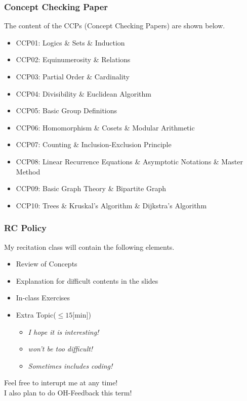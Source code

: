 \documentclass{beamer}
\begin{document}
\begin{frame}
    \frametitle{Concept Checking Paper}
    The content of the CCPs (Concept Checking Papers) are shown below.
    \begin{itemize}
        \item CCP01: \*\*\* Logics \& Sets \& Induction
        \item CCP02: \*\*\* Equinumerosity \& Relations
        \item CCP03: \*\*\* Partial Order \& Cardinality
        \item CCP04: \*\*\* Divisibility \&  Euclidean Algorithm
        \item CCP05: \*\*\* Basic Group Definitions
        \item CCP06: \*\*\* Homomorphism \& Cosets \& Modular Arithmetic
        \item CCP07: \*\*\* Counting \& Inclusion-Exclusion Principle
        \item CCP08: \*\*\* Linear Recurrence Equations \& Asymptotic Notations \& Master Method
        \item CCP09: \*\*\* Basic Graph Theory \& Bipartite Graph
        \item CCP10: \*\*\* Trees \& Kruskal's Algorithm \& Dijkstra's Algorithm
    \end{itemize}
\end{frame}
\begin{frame}
    \frametitle{RC Policy}
    \hh
    My recitation class will contain the following elements.
    \vv
    \begin{itemize}
        \item Review of Concepts
        \item Explanation for difficult contents in the slides
        \item In-class Exercises
        \item Extra Topic($\leq 15 \text{[min]}$)
            \begin{itemize}
                \item \textit{I hope it is interesting!}
                \item \textit{won't be too difficult!}
                \item \textit{Sometimes includes coding!}
            \end{itemize}
    \end{itemize}
    \vs{2em}
    Feel free to interupt me at any time!\\
    I also plan to do OH-Feedback this term!
\end{frame}
\end{document}
